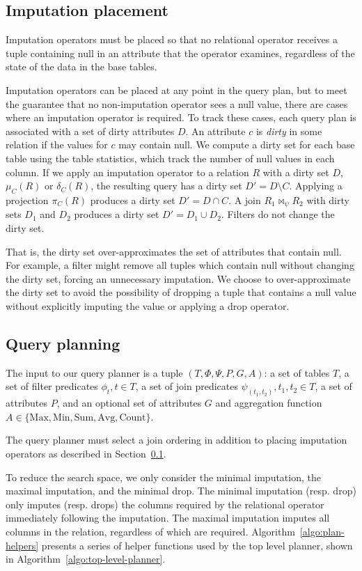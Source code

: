 \subsection{Imputation placement}
\label{sec:placement}
Imputation operators must be placed so that no relational operator receives a tuple containing null in an attribute that the operator examines, regardless of the state of the data in the base tables.

Imputation operators can be placed at any point in the query plan, but to meet the guarantee that no non-imputation operator sees a null value, there are cases where an imputation operator is required. To track these cases, each query plan is associated with a set of dirty attributes $D$. An attribute $c$ is \emph{dirty} in some relation if the values for $c$ may contain null. We compute a dirty set for each base table using the table statistics, which track the number of null values in each column. If we apply an imputation operator to a relation $R$ with a dirty set $D$, $\mu_C (R)$ or $\delta_C (R)$, the resulting query has a dirty set $D' = D \setminus C$.  Applying a projection $\pi_C(R)$ produces a dirty set $D' = D \cap C$. A join $R_1 \Join_\psi R_2$ with dirty sets $D_1$ and $D_2$  produces a dirty set $D' = D_1 \cup D_2$.  Filters do not change the dirty set.

That is, the dirty set over-approximates the set of attributes that contain null. For example, a filter might remove all tuples which contain null without changing the dirty set, forcing an unnecessary imputation. We choose to over-approximate the dirty set to avoid the possibility of dropping a tuple that contains a null value without explicitly imputing the value or applying a drop operator.

\subsection{Query planning}
The input to our query planner is a tuple $(T, \Phi, \Psi, P, G, A)$: a set of tables $T$, a set of filter predicates $\phi_t, t \in T$, a set of join predicates $\psi_(t_1, t_2), t_1, t_2 \in T$, a set of attributes $P$, and an optional set of attributes $G$ and aggregation function $A \in \{\text{Max}, \text{Min}, \text{Sum}, \text{Avg}, \text{Count}\}$.

The query planner must select a join ordering in addition to placing imputation operators as described in Section~\ref{sec:placement}.

To reduce the search space, we only consider the minimal imputation, the maximal imputation, and the minimal drop. The minimal imputation (resp. drop) only imputes (resp. drops) the columns required by the relational operator immediately following the imputation. The maximal imputation imputes all columns in the relation, regardless of which are required.  Algorithm~\ref{algo:plan-helpers} presents
a series of helper functions used by the top level planner, shown in Algorithm~\ref{algo:top-level-planner}.

